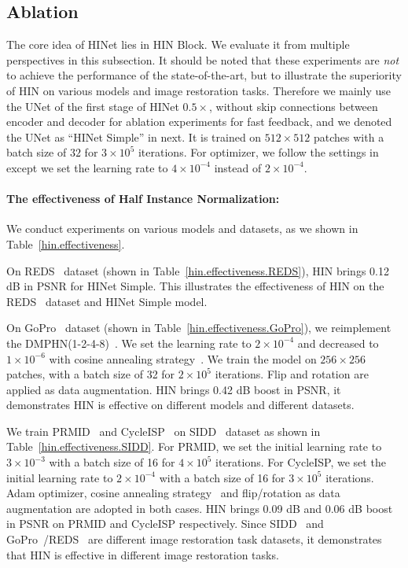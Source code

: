 \documentclass[final]{cvpr}
\begin{document}
\subsection{Ablation}The core idea of HINet lies in HIN Block. We evaluate it from multiple perspectives in this subsection.
It should be noted that these experiments are \emph{not} to achieve the performance of the state-of-the-art, but to illustrate the superiority of HIN on various models and image restoration tasks.
Therefore we mainly use the UNet of the first stage of HINet $0.5\times$, without skip connections between encoder and decoder for ablation experiments for fast feedback, and we denoted the UNet as ``HINet Simple'' in next. It is trained on $512\times512$ patches with a batch size of $32$ for $3\times10^5$ iterations. For optimizer, we follow the settings in ~\cite{Zamir2021MPRNet} except we set the learning rate to $4\times10^{-4}$ instead of $2\times10^{-4}$.

\paragraph{The effectiveness of Half Instance Normalization:} 
We conduct experiments on various models and datasets, as we shown in Table~\ref{hin.effectiveness}. 

On REDS~\cite{nah2019ntire} dataset (shown in Table~\ref{hin.effectiveness.REDS}), HIN brings 0.12 dB in PSNR for HINet Simple. 
This illustrates the effectiveness of HIN on the REDS~\cite{nah2019ntire} dataset and HINet Simple model.

On GoPro~\cite{nah2017deep} dataset (shown in Table~\ref{hin.effectiveness.GoPro}), we reimplement the DMPHN(1-2-4-8)~\cite{Zhang_2019_CVPR}. We set the learning rate to $2\times10^{-4}$ and decreased to $1\times10^{-6}$ with cosine annealing strategy~\cite{loshchilov2016sgdr}. We train the model on $256\times256$ patches, with a batch size of 32 for $2\times10^5$ iterations. Flip and rotation are applied as data augmentation. HIN brings 0.42 dB boost in PSNR, it demonstrates HIN is effective on different models and different datasets.

We train PRMID~\cite{wang2020practical} and CycleISP~\cite{Zamir2020CycleISP} on SIDD~\cite{abdelhamed2018high} dataset as shown in Table~\ref{hin.effectiveness.SIDD}. For PRMID, we set the initial learning rate to $3\times10^{-3}$ with a batch size of 16 for $4\times10^5$ iterations. For CycleISP, we set the initial learning rate to $2\times10^{-4}$ with a batch size of 16 for $3\times10^5$ iterations. Adam optimizer, cosine annealing strategy~\cite{loshchilov2016sgdr} and flip/rotation as data augmentation are adopted in both cases. HIN brings 0.09 dB and 0.06 dB boost in PSNR on PRMID and CycleISP respectively. Since SIDD~\cite{abdelhamed2018high} and GoPro~\cite{nah2017deep}/REDS~\cite{nah2019ntire} are different image restoration task datasets, it demonstrates that HIN is effective in different image restoration tasks.
\end{document}
